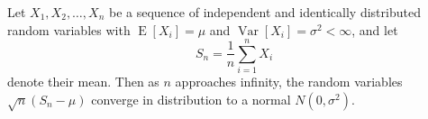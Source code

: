 \documentclass{article}
\begin{document}
Let $X_1, X_2, \dots, X_n$ be a sequence of independent and
identically distributed random variables with
$\operatorname{E}[X_i] = \mu$ and
$\operatorname{Var}[X_i] = \sigma^2 < \infty$, and let
\begin{equation*}
S_n = \frac{1}{n}\sum_{i=1}^{n} X_i
\end{equation*}
denote their mean. Then as $n$ approaches infinity, the
random variables $\sqrt{n}(S_n - \mu)$ converge in
distribution to a normal $N(0, \sigma^2)$.

\end{document}
